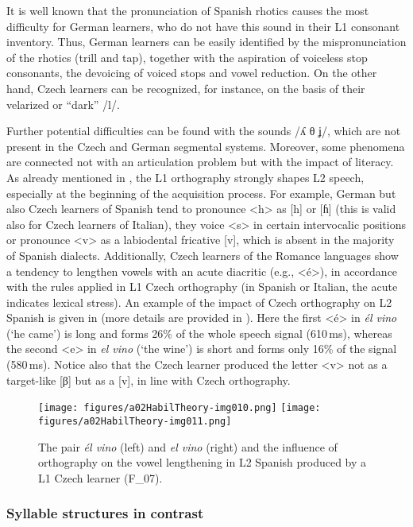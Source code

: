 It is well known that the pronunciation of Spanish rhotics causes the most difficulty for German learners, who do not have this sound in their L1 consonant inventory. Thus, German learners can be easily identified by the mispronunciation of the rhotics (trill and tap), together with the aspiration of voiceless stop consonants, the devoicing of voiced stops and vowel reduction. On the other hand, Czech learners can be recognized, for instance, on the basis of their velarized or “dark” /l/.


Further potential difficulties can be found with the sounds /ʎ θ ʝ/, which are not present in the Czech and German segmental systems. Moreover, some phenomena are connected not with an articulation problem but with the impact of literacy. As already mentioned in , the L1 orthography strongly shapes L2 speech, especially at the beginning of the acquisition process. For example, German but also Czech learners of Spanish tend to pronounce <h> as [h] or [ɦ] (this is valid also for Czech learners of Italian), they voice <s> in certain intervocalic positions or pronounce <v> as a labiodental fricative [v], which is absent in the majority of Spanish dialects. Additionally, Czech learners of the Romance languages show a tendency to lengthen vowels with an acute diacritic (e.g., <é>), in accordance with the rules applied in L1 Czech orthography (in Spanish or Italian, the acute indicates lexical stress). An example of the impact of Czech orthography on L2 Spanish is given in  (more details are provided in \citealt{PeškováEtAl2017}). Here the first <é> in \textit{él vino} (‘he came’) is long and forms 26\% of the whole speech signal (610\,ms), whereas the second <e> in \textit{el vino} (‘the wine’) is short and forms only 16\% of the signal (580\,ms). Notice also that the Czech learner produced the letter <v> not as a target-like [β] but as a [v], in line with Czech orthography.



\begin{figure}
\texttt{[image: figures/a02HabilTheory-img010.png]}\hfill
\texttt{[image: figures/a02HabilTheory-img011.png]}
\caption{The pair \textit{él vino} (left) and \textit{el vino} (right) and the influence of orthography on the vowel lengthening in L2 Spanish produced by a L1 Czech learner (F\_07).}
\label{fig:2.9}
\end{figure}


\subsubsection{Syllable structures in contrast}\label{sec:2.3.1.3}

